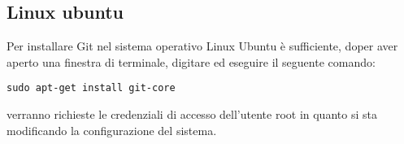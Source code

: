 \subsection{Linux ubuntu}
Per installare Git nel sistema operativo Linux Ubuntu è sufficiente, doper aver aperto una finestra di terminale, digitare ed eseguire il seguente comando:

\begin{center}
\texttt{sudo apt-get install git-core}
\end{center}

verranno richieste le credenziali di accesso dell'utente root in quanto si sta modificando la configurazione del sistema.